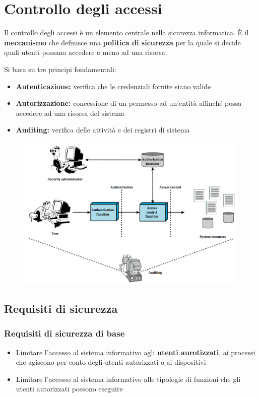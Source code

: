 \chapter{Controllo degli accessi}

Il controllo degli accessi è un elemento centrale nella sicurezza 
informatica. È il \textbf{meccanismo} che definisce una \textbf{politica 
di sicurezza} per la quale si decide quali utenti possano accedere o 
meno ad una risorsa.

\noindent Si basa su tre principi fondamentali:
\begin{itemize}
    \item \textbf{Autenticazione:} verifica che le credenziali fornite 
    siano valide 
    \item \textbf{Autorizzazione:} concessione di un permesso ad un'entità
    affinché possa accedere ad una risorsa del sistema 
    \item \textbf{Auditing:} verifica delle attività e dei registri di 
    sistema
\end{itemize}

\begin{figure}[H]
    \centering
    \includegraphics[width=1\linewidth]{chapters/3/images/ac.png}
\end{figure}

\section{Requisiti di sicurezza}

\subsection{Requisiti di sicurezza di base}
\begin{itemize}
    \item Limitare l'accesso al sistema informativo agli \textbf{utenti aurotizzati}, ai processi che agiscono 
    per conto degli utenti autorizzati o ai dispositivi 
    \item Limitare l'accesso al sistema informativo alle tipologie di funzioni che gli utenti 
    autorizzati possono eseguire 
\end{itemize}

